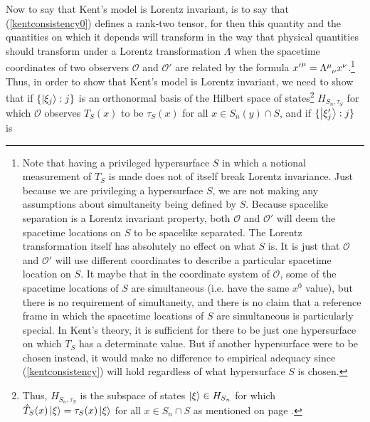 Now to say that Kent's model is Lorentz invariant, is to say that (\ref{kentconsistency0}) defines a rank-two tensor, for then this quantity and the quantities on which it depends will transform in the way that physical quantities should transform under a Lorentz transformation $\Lambda$ when the spacetime coordinates of two observers $\mathcal{O}$ and $\mathcal{O}'$ are related by the formula ${x'}^\mu=\Lambda\indices{^\mu_\nu}x^\nu$.\footnote{Note that having a privileged hypersurface $S$ in which a notional measurement of $T_S$ is made does not of itself break Lorentz invariance. Just because we are privileging a hypersurface $S$, we are not making any assumptions about simultaneity being defined by $S$. Because spacelike separation is a Lorentz invariant property, both $\mathcal{O}$ and $\mathcal{O}'$ will deem the spacetime locations on $S$ to be spacelike separated. The Lorentz transformation itself has absolutely no effect on what $S$ is. It is just that $\mathcal{O}$ and $\mathcal{O}'$ will use different coordinates to describe a particular spacetime location on $S$. It maybe that in the coordinate system of $\mathcal{O}$, some of the spacetime locations of $S$ are simultaneous (i.e. have the same $x^0$ value), but there is no requirement of simultaneity, and there is no claim that a reference frame in which the spacetime locations of $S$ are simultaneous is particularly special. In Kent's theory, it is sufficient for there to be just one hypersurface on which  $T_S$ has a determinate value. But if another hypersurface were to be chosen instead, it would make no difference to empirical adequacy since (\ref{kentconsistency}) will hold regardless of what hypersurface $S$ is chosen.} Thus, in order to show that Kent's model is Lorentz invariant, we need to show that if $\{\ket{\xi_j}:j\}$ is an %
%
orthonormal basis of the Hilbert space of states\footnote{Thus, $H_{S_n,\tau_S}$ is the subspace of states $\ket{\xi}\in H_{S_n}$ for which  $\hat{T}_S(x)\ket{\xi}=\tau_S(x)\ket{\xi}$  for all $x\in S_n\cap S$ as mentioned on page \pageref{HStau}.} $H_{S_n,\tau_S}$ for which $\mathcal{O}$ observes $T_S(x)$ to be $\tau_S(x)$ for all $x\in S_n(y)\cap S$, and if $\{\ket{\xi_j'}:j\}$ is %
%
